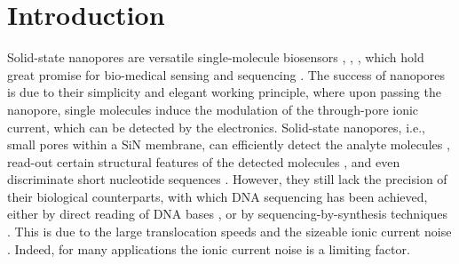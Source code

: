 \section{Introduction}
Solid-state nanopores are versatile single-molecule biosensors \cite{Dekker2007}, \cite{Ying2013}, \cite{Shi2018}, \cite{Lin2018} which hold great promise for bio-medical sensing \cite{Atas2012,Squires2013,Miles2012,Sze2017,Yang2018} and sequencing \cite{Merchant2010}. The success of nanopo\-res \cite{Howorka2009,Kasianowicz2008,Deamer2016,Kasianowicz2016} is due to their simplicity and elegant working principle, where upon passing the nanopore, single molecules induce the modulation of the through-pore ionic current, which can be detected by the electronics. Solid-state nanopores, i.e., small pores within a SiN membrane, can efficiently detect the analyte molecules \cite{Wei2012,Kowalczyk2011a}, read-out certain structural features of the detected molecules \cite{Sze2017,Bell2016,Plesa2016}, and even discriminate  short nucleotide sequences \cite{Venta2013}. However, they still lack the precision of their biological counterparts, with which DNA sequencing has been achieved, either by direct reading of DNA bases \cite{Kasianowicz2002,Manrao2012}, or by sequencing-by-synthesis techniques \cite{Kumar2012,Robertson2007,Fuller2016}. This is due to the large translocation speeds \cite{Plesa2013,Storm2005} and the sizeable ionic current noise \cite{Smeets2009}. Indeed, for many applications \cite{Plesa2013,Ketterer2018,Heerema2015} the ionic current noise is a limiting factor.


